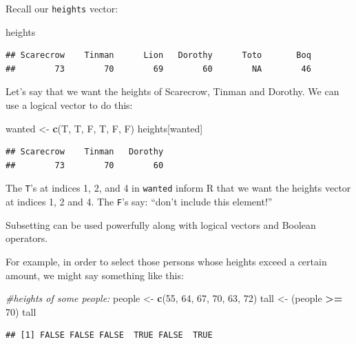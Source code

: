 \documentclass[]{book}
\makeatletter
\newenvironment{Shaded}{\begin{snugshade}}{\end{snugshade}}
\newcommand{\KeywordTok}[1]{\textcolor[rgb]{0.13,0.29,0.53}{\textbf{#1}}}
\newcommand{\DecValTok}[1]{\textcolor[rgb]{0.00,0.00,0.81}{#1}}
\newcommand{\StringTok}[1]{\textcolor[rgb]{0.31,0.60,0.02}{#1}}
\newcommand{\CommentTok}[1]{\textcolor[rgb]{0.56,0.35,0.01}{\textit{#1}}}
\newcommand{\OperatorTok}[1]{\textcolor[rgb]{0.81,0.36,0.00}{\textbf{#1}}}
\newcommand{\NormalTok}[1]{#1}
\newenvironment{kframe}{%
\medskip{}
\setlength{\fboxsep}{.8em}
 \def\at@end@of@kframe{}%
 \ifinner\ifhmode%
  \def\at@end@of@kframe{\end{minipage}}%
  \begin{minipage}{\columnwidth}%
 \fi\fi%
 \def\FrameCommand##1{\hskip\@totalleftmargin \hskip-\fboxsep
 \colorbox{shadecolor}{##1}\hskip-\fboxsep
     \hskip-\linewidth \hskip-\@totalleftmargin \hskip\columnwidth}%
 \MakeFramed {\advance\hsize-\width
   \@totalleftmargin\z@ \linewidth\hsize
   \@setminipage}}%
 {\par\unskip\endMakeFramed%
 \at@end@of@kframe}
\renewenvironment{Shaded}{\begin{kframe}}{\end{kframe}}
\theoremstyle{definition}
\theoremstyle{definition}
\theoremstyle{definition}
\theoremstyle{remark}
\makeatother
\begin{document}
Recall our \texttt{heights} vector:

\begin{Shaded}
\begin{Highlighting}[]
\NormalTok{heights}
\end{Highlighting}
\end{Shaded}

\begin{verbatim}
## Scarecrow    Tinman      Lion   Dorothy      Toto       Boq 
##        73        70        69        60        NA        46
\end{verbatim}

Let's say that we want the heights of Scarecrow, Tinman and Dorothy. We
can use a logical vector to do this:

\begin{Shaded}
\begin{Highlighting}[]
\NormalTok{wanted <-}\StringTok{ }\KeywordTok{c}\NormalTok{(T, T, F, T, F, F)}
\NormalTok{heights[wanted]}
\end{Highlighting}
\end{Shaded}

\begin{verbatim}
## Scarecrow    Tinman   Dorothy 
##        73        70        60
\end{verbatim}

The \texttt{T}'s at indices 1, 2, and 4 in \texttt{wanted} inform R that
we want the heights vector at indices 1, 2 and 4. The \texttt{F}'s say:
``don't include this element!''

Subsetting can be used powerfully along with logical vectors and Boolean
operators.

For example, in order to select those persons whose heights exceed a
certain amount, we might say something like this:

\begin{Shaded}
\begin{Highlighting}[]
\CommentTok{#heights of some people:}
\NormalTok{people <-}\StringTok{ }\KeywordTok{c}\NormalTok{(}\DecValTok{55}\NormalTok{, }\DecValTok{64}\NormalTok{, }\DecValTok{67}\NormalTok{, }\DecValTok{70}\NormalTok{, }\DecValTok{63}\NormalTok{, }\DecValTok{72}\NormalTok{)}
\NormalTok{tall <-}\StringTok{ }\NormalTok{(people }\OperatorTok{>=}\StringTok{ }\DecValTok{70}\NormalTok{)}
\NormalTok{tall}
\end{Highlighting}
\end{Shaded}

\begin{verbatim}
## [1] FALSE FALSE FALSE  TRUE FALSE  TRUE
\end{verbatim}
\end{document}
